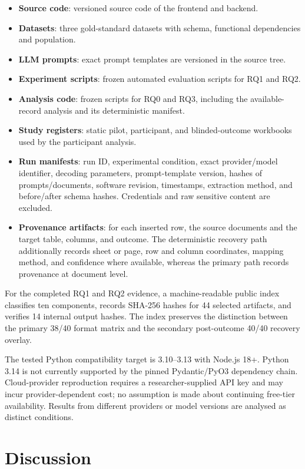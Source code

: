\documentclass[11pt,a4paper]{article}
\begin{document}
\begin{itemize}
  \item \textbf{Source code}: versioned source code of the frontend and backend.
  \item \textbf{Datasets}: three gold-standard datasets with schema, functional dependencies and population.
  \item \textbf{LLM prompts}: exact prompt templates are versioned in the source tree.
  \item \textbf{Experiment scripts}: frozen automated evaluation scripts for RQ1 and RQ2.
  \item \textbf{Analysis code}: frozen scripts for RQ0 and RQ3, including the available-record analysis and its deterministic manifest.
  \item \textbf{Study registers}: static pilot, participant, and blinded-outcome workbooks used by the participant analysis.
  \item \textbf{Run manifests}: run ID, experimental condition, exact provider/model identifier, decoding parameters, prompt-template version, hashes of prompts/documents, software revision, timestamps, extraction method, and before/after schema hashes. Credentials and raw sensitive content are excluded.
  \item \textbf{Provenance artifacts}: for each inserted row, the source documents and the target table, columns, and outcome. The deterministic recovery path additionally records sheet or page, row and column coordinates, mapping method, and confidence where available, whereas the primary path records provenance at document level.
\end{itemize}

For the completed RQ1 and RQ2 evidence, a machine-readable public index
classifies ten components, records SHA-256 hashes for 44 selected artifacts,
and verifies 14 internal output hashes. The index preserves
the distinction between the primary 38/40 format matrix and the secondary
post-outcome 40/40 recovery overlay.

The tested Python compatibility target is 3.10--3.13 with Node.js 18+. Python 3.14 is not currently supported by the pinned Pydantic/PyO3 dependency chain. Cloud-provider reproduction requires a researcher-supplied API key and may incur provider-dependent cost; no assumption is made about continuing free-tier availability. Results from different providers or model versions are analysed as distinct conditions.

\section{Discussion}
\label{sec:discussion}
\end{document}

